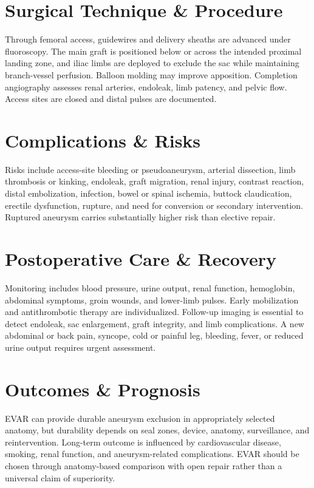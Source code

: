 \section*{Surgical Technique \& Procedure}
Through femoral access, guidewires and delivery sheaths are advanced under fluoroscopy. The main graft is positioned below or across the intended proximal landing zone, and iliac limbs are deployed to exclude the sac while maintaining branch-vessel perfusion. Balloon molding may improve apposition. Completion angiography assesses renal arteries, endoleak, limb patency, and pelvic flow. Access sites are closed and distal pulses are documented.

\section*{Complications \& Risks}
Risks include access-site bleeding or pseudoaneurysm, arterial dissection, limb thrombosis or kinking, endoleak, graft migration, renal injury, contrast reaction, distal embolization, infection, bowel or spinal ischemia, buttock claudication, erectile dysfunction, rupture, and need for conversion or secondary intervention. Ruptured aneurysm carries substantially higher risk than elective repair.

\section*{Postoperative Care \& Recovery}
Monitoring includes blood pressure, urine output, renal function, hemoglobin, abdominal symptoms, groin wounds, and lower-limb pulses. Early mobilization and antithrombotic therapy are individualized. Follow-up imaging is essential to detect endoleak, sac enlargement, graft integrity, and limb complications. A new abdominal or back pain, syncope, cold or painful leg, bleeding, fever, or reduced urine output requires urgent assessment.

\section*{Outcomes \& Prognosis}
EVAR can provide durable aneurysm exclusion in appropriately selected anatomy, but durability depends on seal zones, device, anatomy, surveillance, and reintervention. Long-term outcome is influenced by cardiovascular disease, smoking, renal function, and aneurysm-related complications. EVAR should be chosen through anatomy-based comparison with open repair rather than a universal claim of superiority.

